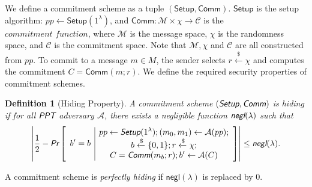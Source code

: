 \documentclass{article}
\newtheorem{definition}{Definition}[section]
\begin{document}
We define a commitment scheme as a tuple $(\textsf{Setup}, \textsf{Comm})$. $\textsf{Setup}$ is the setup algorithm: $pp\leftarrow\textsf{Setup}(1^{\lambda})$, and $\textsf{Comm}:\mathcal{M}\times{\chi}\rightarrow\mathcal{C}$ is the $\textit{commitment function}$, where $\mathcal{M}$ is the message space, $\chi$ is the randomness space, and $\mathcal{C}$ is the commitment space. Note that $\mathcal{M}, \chi$ and $\mathcal{C}$ are all constructed from $pp$.
To commit to a message $m \in M$, the sender selects $r\xleftarrow{\$}\chi$ and computes the commitment $C = \textsf{Comm}(m; r)$. We define the required security properties of commitment schemes.

\begin{definition}[Hiding Property]
A commitment scheme $(\emph{\textsf{Setup}}, \emph{\textsf{Comm}})$ is hiding if for all $\emph{\textsf{PPT}}$ adversary $\mathcal{A}$, there exists a negligible function $\emph{\textsf{negl}}(\lambda)$ such that
\begin{align*}
\left| \frac{1}{2} - \emph{\textsf{Pr}}\left[
\begin{array}{c|c}
    \begin{gathered}
        b' = b
    \end{gathered}
    &
    \begin{gathered}
        pp\leftarrow\emph{\textsf{Setup}}(1^{\lambda}); (m_0, m_1)\leftarrow\mathcal{A}(pp); \\
        b\xleftarrow{\$}\{0,1\}; r \xleftarrow{\$}\chi; \\
        C = \emph{\textsf{Comm}}(m_b; r); b'\leftarrow\mathcal{A}(C)
    \end{gathered}
\end{array}
\right]\right|
\le \emph{\textsf{negl}}(\lambda).
\end{align*}
\end{definition}
A commitment scheme is \textit{perfectly hiding} if $\textsf{negl}(\lambda)$ is replaced by $0$.
\end{document}
